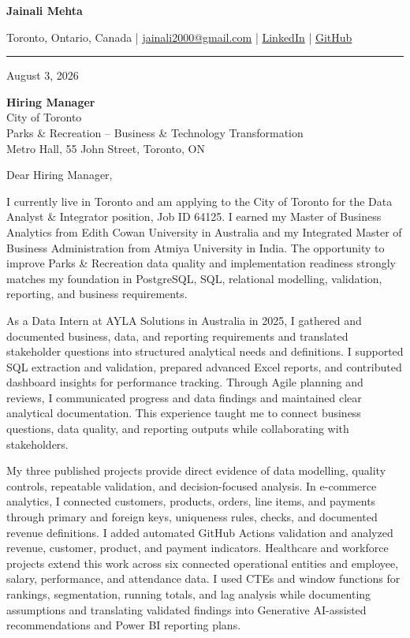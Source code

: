 \documentclass[letterpaper,10pt]{article}
\begin{document}
\begin{center}
  {\fontsize{17}{19}\selectfont\textbf{Jainali Mehta}}\par\vspace{2pt}
  \small Toronto, Ontario, Canada \;|\;
  \href{mailto:jainali2000@gmail.com}{jainali2000@gmail.com} \;|\;
  \href{https://www.linkedin.com/in/jainali-mehta}{LinkedIn} \;|\;
  \href{https://github.com/jainalimehta}{GitHub}
\end{center}
\vspace{-5pt}
\noindent\rule{\textwidth}{0.4pt}

August 3, 2026

\textbf{Hiring Manager}\\
City of Toronto\\
Parks \& Recreation -- Business \& Technology Transformation\\
Metro Hall, 55 John Street, Toronto, ON

Dear Hiring Manager,

I currently live in Toronto and am applying to the City of Toronto for the Data Analyst \& Integrator position, Job ID 64125. I earned my Master of Business Analytics from Edith Cowan University in Australia and my Integrated Master of Business Administration from Atmiya University in India. The opportunity to improve Parks \& Recreation data quality and implementation readiness strongly matches my foundation in PostgreSQL, SQL, relational modelling, validation, reporting, and business requirements.

As a Data Intern at AYLA Solutions in Australia in 2025, I gathered and documented business, data, and reporting requirements and translated stakeholder questions into structured analytical needs and definitions. I supported SQL extraction and validation, prepared advanced Excel reports, and contributed dashboard insights for performance tracking. Through Agile planning and reviews, I communicated progress and data findings and maintained clear analytical documentation. This experience taught me to connect business questions, data quality, and reporting outputs while collaborating with stakeholders.

My three published projects provide direct evidence of data modelling, quality controls, repeatable validation, and decision-focused analysis. In e-commerce analytics, I connected customers, products, orders, line items, and payments through primary and foreign keys, uniqueness rules, checks, and documented revenue definitions. I added automated GitHub Actions validation and analyzed revenue, customer, product, and payment indicators. Healthcare and workforce projects extend this work across six connected operational entities and employee, salary, performance, and attendance data. I used CTEs and window functions for rankings, segmentation, running totals, and lag analysis while documenting assumptions and translating validated findings into Generative AI-assisted recommendations and Power BI reporting plans.
\end{document}
